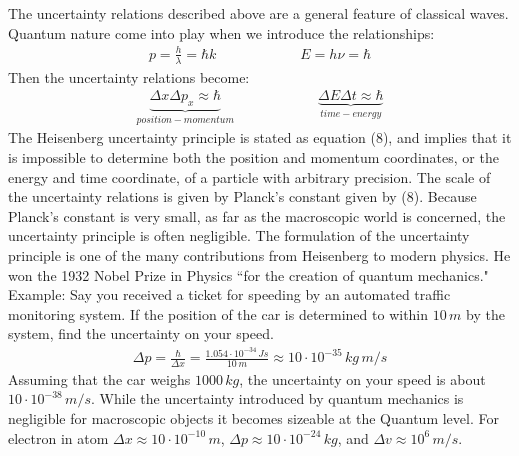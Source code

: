 \documentclass[11pt]{article}
\theoremstyle{break}
\theoremstyle{break}
\newcommand{\ee}[1]{\cdot 10^{#1}}
\newcommand{\example}{\color{green}Example: \color{black}}
\begin{document}
The uncertainty relations described above are a general feature of classical waves. Quantum nature come into play when we introduce the relationships:
\begin{align*}
p = \frac{h}{\lambda} = \hbar k \qquad\qquad\qquad E= h\nu = \hbar 
\end{align*}
Then the uncertainty relations become:
\begin{align}
\underbrace{\Delta x \Delta p_x \approx \hbar}_{position-momentum} \qquad\qquad\qquad
\underbrace{\Delta E \Delta t \approx \hbar}_{time-energy}
\end{align}
The Heisenberg uncertainty principle is stated as equation (8), and implies that it is impossible to determine both the position and momentum coordinates, or the energy and time coordinate, of a particle with arbitrary precision. The scale of the uncertainty relations is given by Planck's constant given by (8). Because Planck's constant is very small, as far as the macroscopic world is concerned, the uncertainty principle is often negligible. The formulation of the uncertainty principle is one of the many contributions from Heisenberg to modern physics. He won the 1932 Nobel Prize in Physics ``for the creation of quantum mechanics."\\

\example
Say you received a ticket for speeding by an automated traffic monitoring system. 
If the position of the car is determined to within $10\, m$ by the system, find the uncertainty on your speed.
\begin{align*}
\Delta p = \frac{\hbar}{\Delta x} = \frac{1.054\ee{-34}\, Js}{10\, m} \approx 10\ee{-35}\, kg\, m/s
\end{align*}
Assuming that the car weighs $1000\, kg$, the uncertainty on your speed is about $10\ee{-38}\, m/s$. While the uncertainty introduced by quantum mechanics is negligible for macroscopic objects it becomes sizeable at the Quantum level. For electron in atom $\Delta x \approx 10\ee{-10}\, m$, $\Delta p \approx 10\ee{-24}\, kg$, and $\Delta v\approx 10^6\, m/s$. \\
\end{document}
